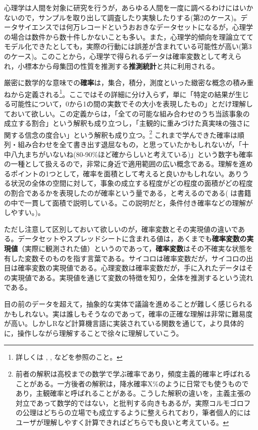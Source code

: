 \documentclass[
  a4paper,
]{ltjsbook}
\begin{document}
心理学は人間を対象に研究を行うが，あらゆる人間を一度に調べるわけにはいかないので，サンプルを取り出して調査したり実験したりする(第2のケース)。データサイエンスでは何万レコードというおおきなデータセットになるが，心理学の場合は数件から数十件しかないことも多い。また，心理学的傾向を理論立ててモデル化できたとしても，実際の行動には誤差が含まれている可能性が高い(第3のケース)。このことから，心理学で得られるデータは確率変数として考えられ，小標本から母集団の性質を推測する\textbf{推測統計}と共に利用される。

厳密に数学的な意味での\textbf{確率}は，集合，積分，測度といった緻密な概念の積み重ねから定義される\footnote{詳しくは
  \textcite{Yoshida2021-02-25} , \textcite{Kono1999-05-01},
  \textcite{Sato1994-02-25} などを参照のこと。}。ここではその詳細に分け入らず，単に「特定の結果が生じる可能性について，0から1の間の実数でその大小を表現したもの」とだけ理解しておいて欲しい。この定義からは，「全ての可能な組み合わせのうち当該事象の成立する割合」という解釈も成り立つし，「主観的に重みづけた真実味の強さに関する信念の度合い」という解釈も成り立つ。\footnote{前者の解釈は高校までの数学で学ぶ確率であり，頻度主義的確率と呼ばれることがある。一方後者の解釈は，降水確率X\%のように日常でも使うものであり，主観確率と呼ばれることがある。こうした解釈の違いを，主義主張の対立であって数学的ではない，と批判する向きもあるが，実際コルモゴロフの公理はどちらの立場でも成立するように整えられており，筆者個人的にはユーザが理解しやすく計算できればどちらでも良いと考えている。}
これまで学んできた確率は順列・組み合わせを全て書き出す退屈なもの，と思っていたかもしれないが，「十中八九まちがいないね(80-90\%ほど確からしいと考えている)」という数字も確率の一種として扱えるので，非常に身近で適用範囲の広い概念である。理解を進めるポイントの1つとして，確率を面積として考えると良いかもしれない。ありうる状況の全体の空間に対して，事象の成立する程度がどの程度の面積がどの程度の割合であるかを表現したのが確率という量である，と考えるのである(
\textcite{Hiraoka200910}
は書籍の中で一貫して面積で説明している。この説明だと，条件付き確率などの理解がしやすい。)。

ただし注意して区別しておいて欲しいのが，確率変数とその実現値の違いである。データセットやスプレッドシートに含まれる値は，あくまでも\textbf{確率変数の実現値}（実際に観測された値）というのであって，\textbf{確率変数}はその不確実な状態を有した変数そのものを指す言葉である。サイコロは確率変数だが，サイコロの出目は確率変数の実現値である。心理変数は確率変数だが，手に入れたデータはその実現値である。実現値を通じて変数の特徴を知り，全体を推測するという流れである。

目の前のデータを超えて，抽象的な実体で議論を進めることが難しく感じられるかもしれない。実は誰しもそうなのであって，確率の正確な理解は非常に難易度が高い。しかしRなど計算機言語に実装されている関数を通じて，より具体的に，操作しながら理解することで徐々に理解していこう。
\end{document}
